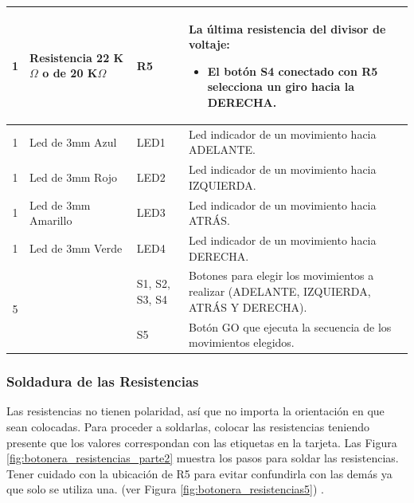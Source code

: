 \documentclass{article}
\begin{document}
\begin{longtable}{|c|>{\raggedright}m{}|>{\centering}m{}|m{}|}
    \\ \hline
    1 & Resistencia 22 K$\Omega$ o de 20 K$\Omega$ & R5 & La última resistencia  del divisor de voltaje: 
    \begin{itemize}
        \item El botón S4 conectado con R5 selecciona un giro hacia la DERECHA.
    \end{itemize}
    \\ \hline
    1 & Led de 3mm Azul & LED1 & Led indicador de un movimiento hacia ADELANTE.
    \\ \hline
    1 & Led de 3mm Rojo & LED2 & Led indicador de un movimiento hacia IZQUIERDA.
    \\ \hline
    1 & Led de 3mm Amarillo & LED3 & Led indicador de un movimiento hacia ATRÁS.
    \\ \hline
    1 & Led de 3mm Verde & LED4 & Led indicador de un movimiento hacia DERECHA. 
    \\ \hline
    \multirow{3}{*}{5} & \multirow{3}{*}{Pulsadores de 12mm} & S1, S2, S3, S4 & Botones para elegir los movimientos a realizar (ADELANTE, IZQUIERDA, ATRÁS Y DERECHA).
    \\ \cline{3-4}
    & & S5 & Botón GO que ejecuta la secuencia de los movimientos elegidos.
    \\ \hline 
\end{longtable}

\subsubsection{Soldadura de las Resistencias}
Las resistencias no tienen polaridad, así que no importa la orientación en que sean colocadas. Para proceder a soldarlas, colocar las resistencias teniendo presente que los valores correspondan con las etiquetas en la tarjeta. Las Figura \ref{fig:botonera_resistencias_parte2} muestra los pasos para soldar las resistencias. Tener cuidado con la ubicación de R5 para evitar confundirla con las demás ya que solo se utiliza una. (ver Figura \ref{fig:botonera_resistencias5}) .
\end{document}
